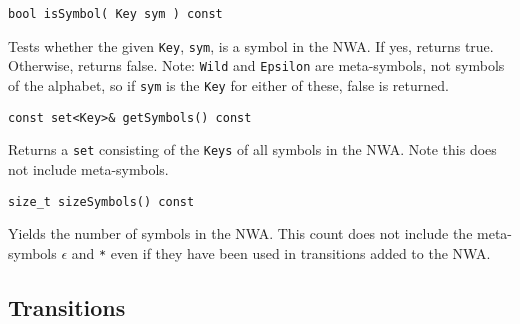 \begin{description}

  \item\texttt{bool isSymbol( Key sym ) const} \nopagebreak

    Tests whether the given \texttt{Key}, \texttt{sym}, is a symbol in the
    NWA.  If yes, returns true.  Otherwise, returns false.  Note:
    \texttt{Wild} and \texttt{Epsilon} are meta-symbols, not symbols of the
    alphabet, so if \texttt{sym} is the \texttt{Key} for either of these,
    false is returned.

  \item\texttt{const set<Key>\& getSymbols() const} \nopagebreak

    Returns a \texttt{set} consisting of the \texttt{Keys} of all symbols in
    the NWA.  Note this does not include meta-symbols.

  \item\texttt{size\_t sizeSymbols() const} \nopagebreak

    Yields the number of symbols in the NWA.  This count does not include the
    meta-symbols \texttt{$\epsilon$} and \texttt{*} even if they have been
    used in transitions added to the NWA. \\

\end{description}

\subsection{Transitions}
\label{Se:Transitions}


